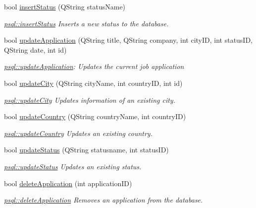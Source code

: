 \begin{DoxyCompactItemize}
bool \hyperlink{classpsql_a601ee0bdc9430b1d674a857f7c94b767}{insert\+Status} (Q\+String status\+Name)
\begin{DoxyCompactList}\small\item\em \hyperlink{classpsql_a601ee0bdc9430b1d674a857f7c94b767}{psql\+::insert\+Status} Inserts a new status to the database. \end{DoxyCompactList}\item 
bool \hyperlink{classpsql_a9a9c4c858ae22eac8a9a4572b16500f5}{update\+Application} (Q\+String title, Q\+String company, int city\+ID, int status\+ID, Q\+String date, int id)
\begin{DoxyCompactList}\small\item\em \hyperlink{classpsql_a9a9c4c858ae22eac8a9a4572b16500f5}{psql\+::update\+Application}\+: Updates the current job application \end{DoxyCompactList}\item 
bool \hyperlink{classpsql_a6adf2ba381783e520c03fe5324dcb010}{update\+City} (Q\+String city\+Name, int country\+ID, int id)
\begin{DoxyCompactList}\small\item\em \hyperlink{classpsql_a6adf2ba381783e520c03fe5324dcb010}{psql\+::update\+City} Updates information of an existing city. \end{DoxyCompactList}\item 
bool \hyperlink{classpsql_ae662278c5fb8ff3471ee1442e69482e2}{update\+Country} (Q\+String country\+Name, int country\+ID)
\begin{DoxyCompactList}\small\item\em \hyperlink{classpsql_ae662278c5fb8ff3471ee1442e69482e2}{psql\+::update\+Country} Updates an existing country. \end{DoxyCompactList}\item 
bool \hyperlink{classpsql_a620364c99c98e20720908deb045536a0}{update\+Status} (Q\+String statusname, int status\+ID)
\begin{DoxyCompactList}\small\item\em \hyperlink{classpsql_a620364c99c98e20720908deb045536a0}{psql\+::update\+Status} Updates an existing status. \end{DoxyCompactList}\item 
bool \hyperlink{classpsql_a999ee8e2d813892411ef502ebc055a79}{delete\+Application} (int application\+ID)
\begin{DoxyCompactList}\small\item\em \hyperlink{classpsql_a999ee8e2d813892411ef502ebc055a79}{psql\+::delete\+Application} Removes an application from the database. \end{DoxyCompactList}\item 

\end{DoxyCompactItemize}
